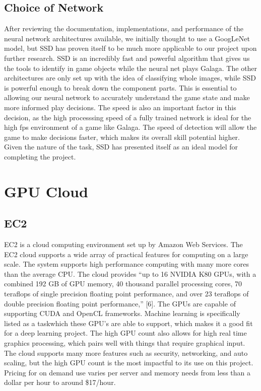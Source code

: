 \subsection{Choice of Network}
After reviewing the documentation, implementations, and performance of the neural network architectures available, we initially thought to use a GoogLeNet model, but SSD has proven itself to be much more applicable to our project upon further research. 
SSD is an incredibly fast and powerful algorithm that gives us the tools to identify in game objects while the neural net plays Galaga.
The other architectures are only set up with the idea of classifying whole images, while SSD is powerful enough to break down the component parts.
This is essential to allowing our neural network to accurately understand the game state and make more informed play decisions. 
The speed is also an important factor in this decision, as the high processsing speed of a fully trained network is ideal for the high fps environment of a game like Galaga. 
The speed of detection will allow the game to make decisions faster, which makes its overall skill potential higher.
Given the nature of the task, SSD has presented itself as an ideal model for completing the project.

\section{GPU Cloud}
\subsection{EC2}
EC2 is a cloud computing environment set up by Amazon Web Services. The EC2 cloud supports a wide array of practical features for computing on a large scale. 
The system supports high performance computing with many more cores than the average CPU. The cloud provides “up to 16 NVIDIA K80 GPUs, with a combined 192 GB of GPU memory, 40 thousand parallel processing cores, 70 teraflops of single precision floating point performance, and over 23 teraflops of double precision floating point performance,” [6]. 
The GPUs are capable of supporting CUDA and OpenCL frameworks. 
Machine learning is specifically listed as a taskwhich these GPU’s are able to support, which makes it a good fit for a deep learning project. 
The high GPU count also allows for high real time graphics processing, which pairs well with things that require graphical input.
The cloud supports many more features such as security, networking, and auto scaling, but the high GPU count is the most impactful to its use on this project. 
Pricing for on demand use varies per server and memory needs from less than a dollar per hour to around \$17/hour.

